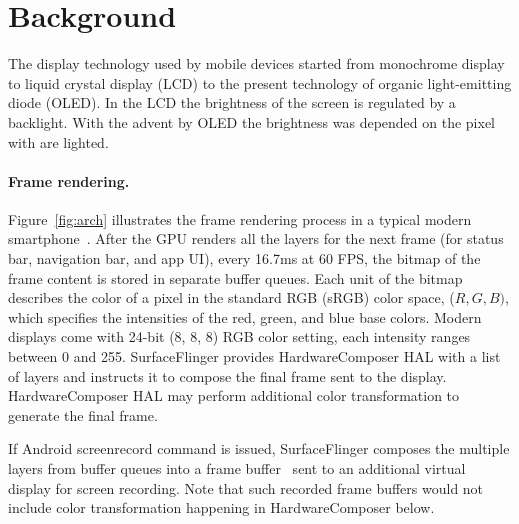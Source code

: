 \section{Background}
\label{sec:back}

The display technology used by mobile devices started from monochrome display
to liquid crystal display (LCD) to the present technology of organic
light-emitting diode (OLED).
In the LCD the brightness of the screen is regulated by a backlight. With the
advent by OLED the brightness was depended on the pixel with are lighted.
\fi

\paragraph{Frame rendering.}
Figure~\ref{fig:arch} illustrates the frame rendering process in a
typical modern smartphone~\cite{arch_graphicspipeline}.
After the GPU renders all the layers for the next frame
(for status bar, navigation bar, and app UI),
\eg every 16.7ms at 60 FPS, 
the bitmap of the frame content is stored in separate buffer queues.
%
Each unit of the bitmap describes the color of
a pixel in the standard RGB (sRGB) color space, ($R, G,
B)$, which specifies the intensities of the red, green, and blue base
colors.  Modern displays come with 24-bit (8, 8, 8) RGB color setting,
\ie each intensity ranges between 0 and 255.
%
SurfaceFlinger provides HardwareComposer HAL with a list of layers and
instructs it to compose the final frame sent to the display.
HardwareComposer HAL may perform additional color transformation to
generate the final frame.

If Android screenrecord command is issued, SurfaceFlinger composes
the multiple layers from buffer queues into a frame
buffer~\cite{arch_surfaceflinger} sent to an additional virtual
display for screen recording. Note that such recorded frame buffers would not
include color transformation happening in HardwareComposer below.

